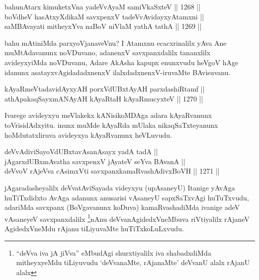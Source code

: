 \begin{shl}
bahunA\s tarx kimuketxVna yadeVvAyaM samiVkaSxteV ||  1268 ||  \\
boVdheV hasAtxyXdikaM savxpenxV tadeVvAvidayxyA\s \s tamxni ||  \\
saMBAvayati mitheyxYva naBoV niVlaM yathA tathA ||  1269 ||  
\end{shl}

\begin{artha}
bahu mAtiniMda parxyoVjanaveVnu? I Atamxnu ecacxrinalilx yAva Ane muMtAdavanunx noVDuvano, adanenxV savxpanxdalilx tananxlilx avideyxyiMda noVDuvanu, Adare AkAsha kapupx enunxvudu heVgoV hAge idanunx asatayxvAgidadadxnenxV ilalxdadxnenxV-iruvaMte BAvisuvanu.
\end{artha}


\begin{shl}
kAyaRmeVtadavidAyxyAH porxVdUBxtAyAH parxdashiRtamf || \\
athApakaqSayxmANAyAH kAyaRtaH kAyaRmucyxteV ||  1270 ||  
\end{shl}

\begin{artha}
Ivarege avideyxyu meVlakekx kANisikoMDAga adara kAyaRvanunx toVrisidAdxyitu. inunx muMde kAyaRda mUlaka nikaqSaTxteyanunx hoMdutatxliruva avideyxya kAyaRvanunx heVLuvudu.
\end{artha}


\begin{shl}
deVvAdiviSayoVdUBxtavAsanA\s sayx yadA tadA || \\
jAgarxdUBxmAvatha savxpenxV jAyateV seYva BAvanA || \\
deVvoV rAjeVva cAsimxVti savxpanxkamaRvashAdivxBoVH ||  1271 ||  
\end{shl}

\begin{artha}
jAgaradasheyalilx deVvatAviSayada videyxyu (upAsaneyU) Itanige yAvAga huTiTxdidxto AvAga adanunx anusarisi vAsaneyU sapxSaTxvAgi huTuTxvudu, adariMda savxpanx (BoVgavanunx koDuva) kamaRvashadiMda ivanige adeV vAsaneyeV savxpanxdalilx \footnote{``deVva iva jA jiVva'' eMbudAgi shurxtiyalilx iva shabadxdiMda mitheyxyeMdu tiLiyuvudu `deVvanaMte, rAjanaMte' deVvanU alalx rAjanU alalx}nAnu deVvanAgidedxVneMbuva riVtiyalilx rAjaneV AgidedxVneMdu rAjanu tiLiyuvaMte huTiTxkoLuLxvudu.
\end{artha}


